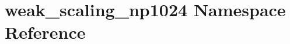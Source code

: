 \hypertarget{namespaceweak__scaling__np1024}{}\section{weak\+\_\+scaling\+\_\+np1024 Namespace Reference}
\label{namespaceweak__scaling__np1024}
